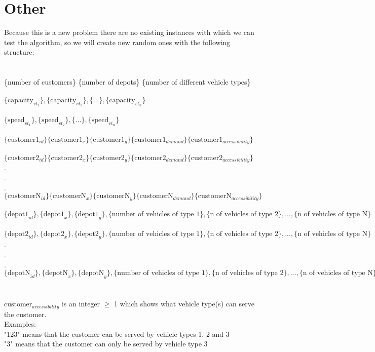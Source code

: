 \documentclass[twocolumn]{article}
\begin{document}
	\section{Other}

	Because this is a new problem there are no existing instances with which we can test the algorithm, so we will create new random ones with the following structure:\\\\\\
	\{number of customers\} 	\{number of depots\} 	\{number of different vehicle types\}\\\\
	$\{\text{capacity}_{vt_1}\}, \{\text{capacity}_{vt_2}\},\{ ...\}, \{\text{capacity}_{vt_n}\}$\\\\
	$\{\text{speed}_{vt_1}\}, \{\text{speed}_{vt_2}\},\{ ...\}, \{\text{speed}_{vt_n}\}$\\\\
	$\{\text{customer1}_{id}\} \{\text{customer1}_x\} \{\text{customer1}_y\} \{\text{customer1}_{demand}\} \{\text{customer1}_{accessibility}\}$\\\\
	$\{\text{customer2}_{id}\} \{\text{customer2}_x\} \{\text{customer2}_y\} \{\text{customer2}_{demand}\} \{\text{customer2}_{accessibility}\}$\\
	.\\
	.\\
	.\\
	$\{\text{customerN}_{id}\} \{\text{customerN}_x\} \{\text{customerN}_y\} \{\text{customerN}_{demand}\} \{\text{customerN}_{accessibility}\}$\\\\
	$\{\text{depot1}_{id}\}, \{\text{depot1}_x\}, \{\text{depot1}_y\}, \{\text{number of vehicles of type 1}\}, \{\text{n of vehicles of type 2}\}, \text{...}, \{\text{n of vehicles of type N}\}$\\\\
	$\{\text{depot2}_{id}\}, \{\text{depot2}_x\}, \{\text{depot2}_y\}, \{\text{number of vehicles of type 1}\}, \{\text{n of vehicles of type 2}\}, \text{...}, \{\text{n of vehicles of type N}\}$\\
	.\\
	.\\
	.\\
	$\{\text{depotN}_{id}\}, \{\text{depotN}_x\}, \{\text{depotN}_y\}, \{\text{number of vehicles of type 1}\}, \{\text{n of vehicles of type 2}\}, \text{...}, \{\text{n of vehicles of type N}\}$\\\\\\
	$\text{customer}_{accessibility}$ is an integer $\geq$ 1 which shows what vehicle type(s) can serve the customer.\\
	Examples:\\
	"123" means that the customer can be served by vehicle types 1, 2 and 3\\
	"3" means that the customer can only be served by vehicle type 3\\
	
	
\end{document}
